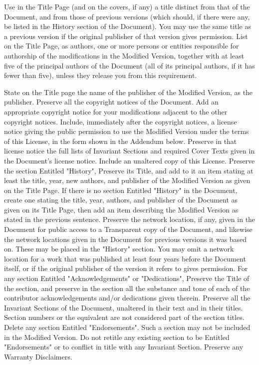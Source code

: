 \documentclass{article}
\begin{document}
Use in the Title Page (and on the covers, if any) a title distinct from that of the Document, and from those of previous versions (which should, if there were any, be listed in the History section of the Document).  You may use the same title as a previous version if the original publisher of that version gives permission.  List on the Title Page, as authors, one or more persons or entities responsible for authorship of the modifications in the Modified Version, together with at least five of the principal authors of the Document (all of its principal authors, if it has fewer than five), unless they release you from this requirement.  



State on the Title page the name of the publisher of the Modified Version, as the publisher.  Preserve all the copyright notices of the Document. Add an appropriate copyright notice for your modifications adjacent to the other copyright notices. Include, immediately after the copyright notices, a license notice giving the public permission to use the Modified Version under the terms of this License, in the form shown in the Addendum below. Preserve in that license notice the full lists of Invariant Sections and required Cover Texts given in the Document's license notice. Include an unaltered copy of this License. Preserve the section Entitled "History", Preserve its Title, and add to it an item stating at least the title, year, new authors, and publisher of the Modified Version as given on the Title Page. If there is no section Entitled "History" in the Document, create one stating the title, year, authors, and publisher of the Document as given on its Title Page, then add an item describing the Modified Version as stated in the previous sentence. Preserve the network location, if any, given in the Document for public access to a Transparent copy of the Document, and likewise the network locations given in the Document for previous versions it was based on. These may be placed in the "History" section. You may omit a network location for a work that was published at least four years before the Document itself, or if the original publisher of the version it refers to gives permission. For any section Entitled "Acknowledgements" or "Dedications", Preserve the Title of the section, and preserve in the section all the substance and tone of each of the contributor acknowledgements and/or dedications given therein. Preserve all the Invariant Sections of the Document, unaltered in their text and in their titles. Section numbers or the equivalent are not considered part of the section titles. Delete any section Entitled "Endorsements".  Such a section may not be included in the Modified Version. Do not retitle any existing section to be Entitled "Endorsements" or to conflict in title with any Invariant Section. Preserve any Warranty Disclaimers. 
\end{document}
